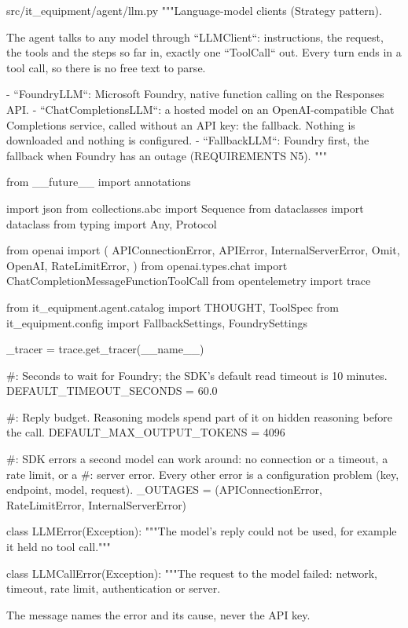 \documentclass[11pt,letterpaper]{article}
\renewcommand{\_}{\textunderscore\allowbreak}
\begin{document}
\begin{codebox}{src/it_equipment/agent/llm.py}
"""Language-model clients (Strategy pattern).

The agent talks to any model through ``LLMClient``: instructions, the request, the tools and
the steps so far in, exactly one ``ToolCall`` out. Every turn ends in a tool call, so there is
no free text to parse.

- ``FoundryLLM``: Microsoft Foundry, native function calling on the Responses API.
- ``ChatCompletionsLLM``: a hosted model on an OpenAI-compatible Chat Completions service,
  called without an API key: the fallback. Nothing is downloaded and nothing is configured.
- ``FallbackLLM``: Foundry first, the fallback when Foundry has an outage (REQUIREMENTS N5).
"""

from __future__ import annotations

import json
from collections.abc import Sequence
from dataclasses import dataclass
from typing import Any, Protocol

from openai import (
    APIConnectionError,
    APIError,
    InternalServerError,
    Omit,
    OpenAI,
    RateLimitError,
)
from openai.types.chat import ChatCompletionMessageFunctionToolCall
from opentelemetry import trace

from it_equipment.agent.catalog import THOUGHT, ToolSpec
from it_equipment.config import FallbackSettings, FoundrySettings

_tracer = trace.get_tracer(__name__)

#: Seconds to wait for Foundry; the SDK's default read timeout is 10 minutes.
DEFAULT_TIMEOUT_SECONDS = 60.0

#: Reply budget. Reasoning models spend part of it on hidden reasoning before the call.
DEFAULT_MAX_OUTPUT_TOKENS = 4096

#: SDK errors a second model can work around: no connection or a timeout, a rate limit, or a
#: server error. Every other error is a configuration problem (key, endpoint, model, request).
_OUTAGES = (APIConnectionError, RateLimitError, InternalServerError)


class LLMError(Exception):
    """The model's reply could not be used, for example it held no tool call."""


class LLMCallError(Exception):
    """The request to the model failed: network, timeout, rate limit, authentication or server.

    The message names the error and its cause, never the API key.


\end{codebox}
\end{document}
